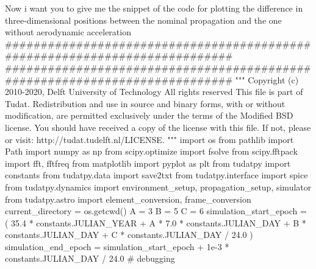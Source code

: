 {}\markdownRendererThematicBreak{}\markdownRendererInterblockSeparator
{}
\markdownRendererSectionEnd \markdownRendererSectionBegin
{}\markdownRendererInterblockSeparator
{}Now i want you to give me the snippet of the code for plotting the difference in three-dimensional positions between the nominal propagation and the one without aerodynamic acceleration\markdownRendererInterblockSeparator
{}###########################################################################\markdownRendererInterblockSeparator
{}
\markdownRendererSectionEnd 
\markdownRendererSectionEnd \markdownRendererSectionBegin
\markdownRendererHeadingOne{}\markdownRendererInterblockSeparator
{}
\markdownRendererSectionEnd \markdownRendererSectionBegin
{}\markdownRendererInterblockSeparator
{}
\markdownRendererSectionEnd \markdownRendererSectionBegin
\markdownRendererHeadingOne{}\markdownRendererInterblockSeparator
{}
\markdownRendererSectionEnd \markdownRendererSectionBegin
{}\markdownRendererInterblockSeparator
{}
\markdownRendererSectionEnd \markdownRendererSectionBegin
\markdownRendererHeadingOne{}\markdownRendererInterblockSeparator
{}########################################################################### """ Copyright (c) 2010-2020, Delft University of Technology All rights reserved This file is part of Tudat. Redistribution and use in source and binary forms, with or without modification, are permitted exclusively under the terms of the Modified BSD license. You should have received a copy of the license with this file. If not, please or visit: http://tudat.tudelft.nl/LICENSE. """ import os from pathlib import Path import numpy as np from scipy.optimize import fsolve from scipy.fftpack import fft, fftfreq from matplotlib import pyplot as plt from tudatpy import constants from tudatpy.data import save2txt from tudatpy.interface import spice from tudatpy.dynamics import environment_setup, propagation_setup, simulator from tudatpy.astro import element_conversion, frame_conversion\markdownRendererInterblockSeparator
{}
\markdownRendererSectionEnd \markdownRendererSectionBegin
{}\markdownRendererInterblockSeparator
{}current_directory = os.getcwd()\markdownRendererInterblockSeparator
{}
\markdownRendererSectionEnd \markdownRendererSectionBegin
{}\markdownRendererInterblockSeparator
{}A = 3 B = 5 C = 6 simulation_start_epoch = ( 35.4 * constants.JULIAN_YEAR + A * 7.0 * constants.JULIAN_DAY + B * constants.JULIAN_DAY + C * constants.JULIAN_DAY / 24.0 ) simulation_end_epoch = simulation_start_epoch + 1e-3 * constants.JULIAN_DAY / 24.0 # debugging\markdownRendererInterblockSeparator

